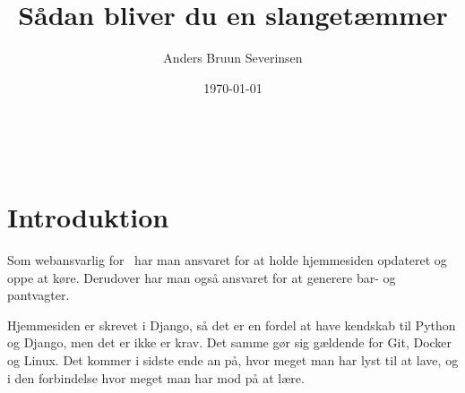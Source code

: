 

\title{Sådan bliver du en slangetæmmer}
\date{\today}
\author{Anders Bruun Severinsen}



\maketitle

\tableofcontents \

\section{Introduktion}

Som webansvarlig for \fredagscafeen\ har man ansvaret for at holde hjemmesiden opdateret og oppe at køre.
Derudover har man også ansvaret for at generere bar- og pantvagter.

Hjemmesiden er skrevet i Django, så det er en fordel at have kendskab til Python og Django, men det er
ikke er krav. Det samme gør sig gældende for Git, Docker og Linux. Det kommer i sidste ende an på, hvor
meget man har lyst til at lave, og i den forbindelse hvor meget man har mod på at lære.









